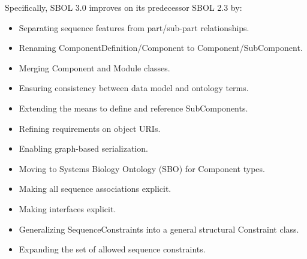 Specifically, SBOL 3.0 improves on its predecessor SBOL 2.3 by:
\begin{itemize}
\item Separating sequence features from part/sub-part relationships.
\item Renaming ComponentDefinition/Component to Component/SubComponent.
\item Merging Component and Module classes.
\item Ensuring consistency between data model and ontology terms.
\item Extending the means to define and reference SubComponents.
\item Refining requirements on object URIs.
\item Enabling graph-based serialization.
\item Moving to Systems Biology Ontology (SBO) for Component types.
\item Making all sequence associations explicit.
\item Making interfaces explicit.
\item Generalizing SequenceConstraints into a general structural Constraint class.
\item Expanding the set of allowed sequence constraints.
\end{itemize}

